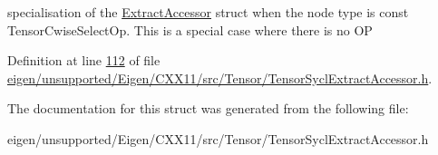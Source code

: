 specialisation of the \hyperlink{struct_eigen_1_1_tensor_sycl_1_1internal_1_1_extract_accessor}{Extract\+Accessor} struct when the node type is const Tensor\+Cwise\+Select\+Op. This is a special case where there is no OP 

Definition at line \hyperlink{eigen_2unsupported_2_eigen_2_c_x_x11_2src_2_tensor_2_tensor_sycl_extract_accessor_8h_source_l00112}{112} of file \hyperlink{eigen_2unsupported_2_eigen_2_c_x_x11_2src_2_tensor_2_tensor_sycl_extract_accessor_8h_source}{eigen/unsupported/\+Eigen/\+C\+X\+X11/src/\+Tensor/\+Tensor\+Sycl\+Extract\+Accessor.\+h}.



The documentation for this struct was generated from the following file\+:\begin{DoxyCompactItemize}
\item 
eigen/unsupported/\+Eigen/\+C\+X\+X11/src/\+Tensor/\+Tensor\+Sycl\+Extract\+Accessor.\+h\end{DoxyCompactItemize}
